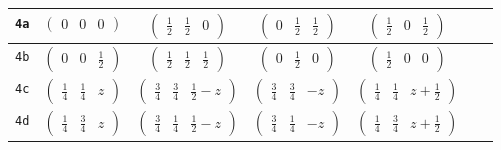 \documentclass[fleqn,9pt,landscape]{jsarticle}
\begin{document}
\begin{center}
\begin{longtable}{ccccccc}
{\tt 4a} & $ \begin{pmatrix} 0 & 0 & 0 \end{pmatrix} $ & $ \begin{pmatrix} \frac{1}{2} & \frac{1}{2} & 0 \end{pmatrix} $ & $ \begin{pmatrix} 0 & \frac{1}{2} & \frac{1}{2} \end{pmatrix} $ & $ \begin{pmatrix} \frac{1}{2} & 0 & \frac{1}{2} \end{pmatrix} $ & $  $ & $  $ \\ \hline
{\tt 4b} & $ \begin{pmatrix} 0 & 0 & \frac{1}{2} \end{pmatrix} $ & $ \begin{pmatrix} \frac{1}{2} & \frac{1}{2} & \frac{1}{2} \end{pmatrix} $ & $ \begin{pmatrix} 0 & \frac{1}{2} & 0 \end{pmatrix} $ & $ \begin{pmatrix} \frac{1}{2} & 0 & 0 \end{pmatrix} $ & $  $ & $  $ \\ \hline
{\tt 4c} & $ \begin{pmatrix} \frac{1}{4} & \frac{1}{4} & z \end{pmatrix} $ & $ \begin{pmatrix} \frac{3}{4} & \frac{3}{4} & \frac{1}{2} - z \end{pmatrix} $ & $ \begin{pmatrix} \frac{3}{4} & \frac{3}{4} & - z \end{pmatrix} $ & $ \begin{pmatrix} \frac{1}{4} & \frac{1}{4} & z + \frac{1}{2} \end{pmatrix} $ & $  $ & $  $ \\ \hline
{\tt 4d} & $ \begin{pmatrix} \frac{1}{4} & \frac{3}{4} & z \end{pmatrix} $ & $ \begin{pmatrix} \frac{3}{4} & \frac{1}{4} & \frac{1}{2} - z \end{pmatrix} $ & $ \begin{pmatrix} \frac{3}{4} & \frac{1}{4} & - z \end{pmatrix} $ & $ \begin{pmatrix} \frac{1}{4} & \frac{3}{4} & z + \frac{1}{2} \end{pmatrix} $ & $  $ & $  $ \\ \hline

\end{longtable}
\end{center}
\end{document}
